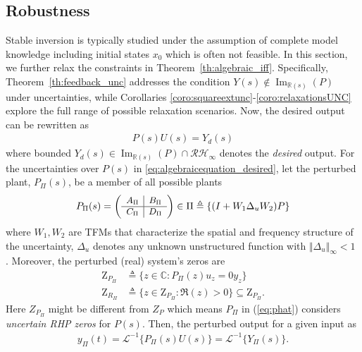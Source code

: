 \documentclass[journal]{IEEEtran}
\newcommand{\Laplace}{\mathscr{L}}
\theoremstyle{remark}
\DeclareMathOperator*{\im}{Im}
\begin{document}
\subsection{Robustness} \label{sec:practical_modif}
Stable inversion is typically studied under the assumption of complete model knowledge including initial states $x_0$ which is often not feasible. In this section, we further 
relax the constraints in Theorem~\ref{th:algebraic_iff}. Specifically, Theorem~\ref{th:feedback_unc} addresses the condition $Y(s)\notin \im_{\mathbb{R}(s)}(P)$ under uncertainties, while Corollaries \ref{coro:squareextunc}-\ref{coro:relaxationsUNC} explore 
the full range of possible relaxation scenarios. Now, the desired output can be rewritten as
\begin{align} \label{eq:algebraicequation_desired}
P(s)U(s)=Y_d(s) 
\end{align}
where bounded $Y_d(s)\in \im_{\mathbb{R}(s)}(P) \cap \mathcal{RH}_\infty$ denotes the \textit{desired} output. For the uncertainties over $P(s)$ in \eqref{eq:algebraicequation_desired}, let the perturbed plant, $P_\Pi(s)$, be a member of all possible plants
\begin{equation} \label{eq:phat}
P_\Pi(s) = \small \left(\begin{array}{c|c}
   A_\Pi & B_\Pi \\ \hline
   C_\Pi & D_\Pi
\end{array}\right) \normalsize \in  \Pi \triangleq \left\{ ({I}+W_1 \Delta_u {W}_2){P} \right\}
\end{equation}
%
where $W_1, W_2$ are TFMs that characterize the spatial and frequency structure of the uncertainty, $\Delta_u$ denotes any unknown unstructured function with 
$\Vert \Delta_u \Vert_\infty <1$ \cite[chapter 8.1]{zhou1998essentials}. Moreover, the perturbed (real) system's zeros are
\begin{align} \label{eq:zerosPPi}
\text{Z}_{P_\Pi} &\triangleq \{z \in \mathbb{C} : P_\Pi(z)u_z=0y_z\}\\
\text{Z}_{R_\Pi} &\triangleq  \{z \in \text{Z}_{P_\Pi} : \Re(z) > 0\} \subseteq \text{Z}_{P_\Pi}.  \label{eq:rhpzerosPpi}
\end{align}
Here ${Z}_{P_\Pi}$ might be different from $Z_P$ which means $P_\Pi$ in (\ref{eq:phat}) considers \textit{uncertain RHP zeros} for $P(s)$. Then, the perturbed output for a given input as
\begin{align}
    y_\Pi(t)=\Laplace^{-1}\{ P_\Pi(s)U(s) \} =\Laplace^{-1}\{ Y_\Pi(s) \}.
\end{align}
\end{document}
